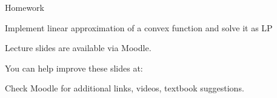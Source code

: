\documentclass{beamer}
\begin{document}
\begin{frame}{Homework}
\begin{flushleft}

Implement linear approximation of a convex function and solve it as LP

\end{flushleft}
\end{frame}



\begin{frame}
	\centerline{Lecture slides are available via Moodle.}
	\bigskip
	\centerline{You can help improve these slides at:}
	\centerline{
		\mygit
	}
	\bigskip
	
	\textcolor{black}{}
	\bigskip
	
	
	\centerline{Check Moodle for additional links, videos, textbook suggestions.}
\end{frame}
\end{document}
